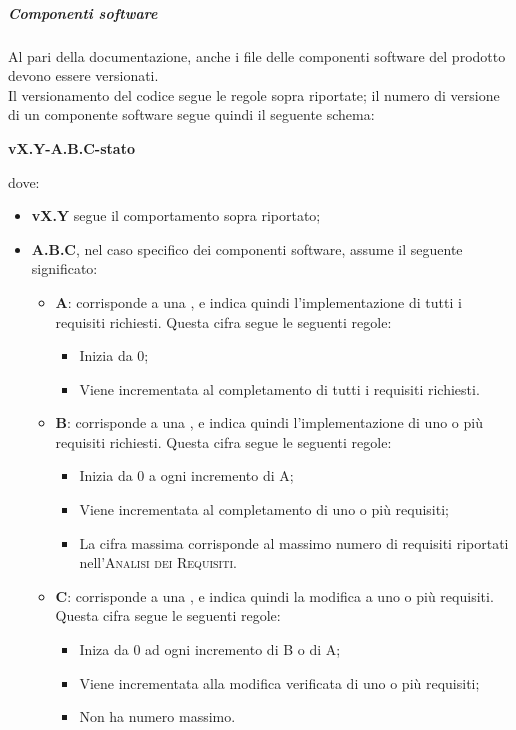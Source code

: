 \documentclass[../norme-di-progetto.tex]{subfiles}
\begin{document}
\subparagraph{Componenti software}
Al pari della documentazione, anche i file delle componenti software del prodotto devono essere versionati. \\
Il versionamento del codice segue le regole sopra riportate; il numero di versione di un componente software segue quindi il seguente schema:
\begin{center}
  \centering
  \textbf{vX.Y-A.B.C-stato}
\end{center} dove:
\begin{itemize}
  \item \textbf{vX.Y} segue il comportamento sopra riportato;
  \item \textbf{A.B.C}, nel caso specifico dei componenti software, assume il seguente significato:
  \begin{itemize}
    \item \textbf{A}: corrisponde a una , e indica quindi l'implementazione di tutti i requisiti richiesti. Questa cifra segue le seguenti regole:
    \begin{itemize}
      \item Inizia da 0;
      \item Viene incrementata al completamento di tutti i requisiti richiesti.
    \end{itemize}
    \item \textbf{B}: corrisponde a una , e indica quindi l'implementazione di uno o più requisiti richiesti. Questa cifra segue le seguenti regole:
    \begin{itemize}
      \item Inizia da 0 a ogni incremento di A;
      \item Viene incrementata al completamento di uno o più requisiti;
      \item La cifra massima corrisponde al massimo numero di requisiti riportati nell'\textsc{Analisi dei Requisiti}.
    \end{itemize}
    \item \textbf{C}: corrisponde a una , e indica quindi la modifica a uno o più requisiti. Questa cifra segue le seguenti regole:
    \begin{itemize}
      \item Iniza da 0 ad ogni incremento di B o di A;
      \item Viene incrementata alla modifica verificata di uno o più requisiti;
      \item Non ha numero massimo.
    \end{itemize}

\end{itemize}
\end{itemize}
\end{document}
